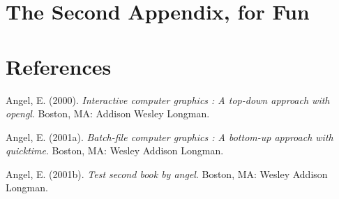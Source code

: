 \documentclass[12pt,twoside]{dukestatscithesis}
\theoremstyle{definition}
\theoremstyle{definition}
\theoremstyle{definition}
\theoremstyle{remark}
\begin{document}
\chapter{The Second Appendix, for
Fun}\label{the-second-appendix-for-fun}

\backmatter

\chapter*{References}\label{references}


\noindent

\setlength{\parindent}{-0.20in} \setlength{\leftskip}{0.20in}
\setlength{\parskip}{8pt}

\hypertarget{refs}{}
\hypertarget{ref-angel2000}{}
Angel, E. (2000). \emph{Interactive computer graphics : A top-down
approach with opengl}. Boston, MA: Addison Wesley Longman.

\hypertarget{ref-angel2001}{}
Angel, E. (2001a). \emph{Batch-file computer graphics : A bottom-up
approach with quicktime}. Boston, MA: Wesley Addison Longman.

\hypertarget{ref-angel2002a}{}
Angel, E. (2001b). \emph{Test second book by angel}. Boston, MA: Wesley
Addison Longman.


\end{document}
